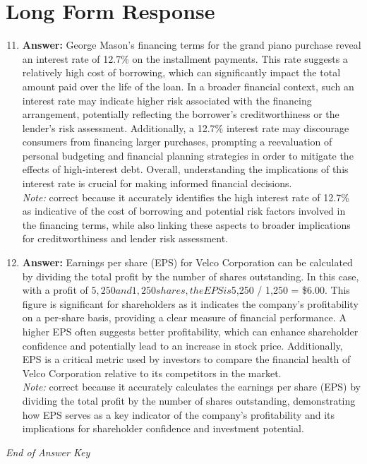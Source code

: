 \documentclass[12pt]{article}
\begin{document}
\section*{Long Form Response}
\begin{enumerate}[label=\arabic*.]
\setcounter{enumi}{10}
\item \textbf{Answer:} George Mason's financing terms for the grand piano purchase reveal an interest rate of 12.7\% on the installment payments. This rate suggests a relatively high cost of borrowing, which can significantly impact the total amount paid over the life of the loan. In a broader financial context, such an interest rate may indicate higher risk associated with the financing arrangement, potentially reflecting the borrower's creditworthiness or the lender's risk assessment. Additionally, a 12.7\% interest rate may discourage consumers from financing larger purchases, prompting a reevaluation of personal budgeting and financial planning strategies in order to mitigate the effects of high-interest debt. Overall, understanding the implications of this interest rate is crucial for making informed financial decisions.
\\ \textit{Note:} correct because it accurately identifies the high interest rate of 12.7\% as indicative of the cost of borrowing and potential risk factors involved in the financing terms, while also linking these aspects to broader implications for creditworthiness and lender risk assessment.
\item \textbf{Answer:} Earnings per share (EPS) for Velco Corporation can be calculated by dividing the total profit by the number of shares outstanding. In this case, with a profit of $5,250 and 1,250 shares, the EPS is $5,250 / 1,250 = \$6.00. This figure is significant for shareholders as it indicates the company's profitability on a per-share basis, providing a clear measure of financial performance. A higher EPS often suggests better profitability, which can enhance shareholder confidence and potentially lead to an increase in stock price. Additionally, EPS is a critical metric used by investors to compare the financial health of Velco Corporation relative to its competitors in the market.
\\ \textit{Note:} correct because it accurately calculates the earnings per share (EPS) by dividing the total profit by the number of shares outstanding, demonstrating how EPS serves as a key indicator of the company's profitability and its implications for shareholder confidence and investment potential.
\end{enumerate}

\vfill
\noindent\textit{End of Answer Key}
\end{document}

